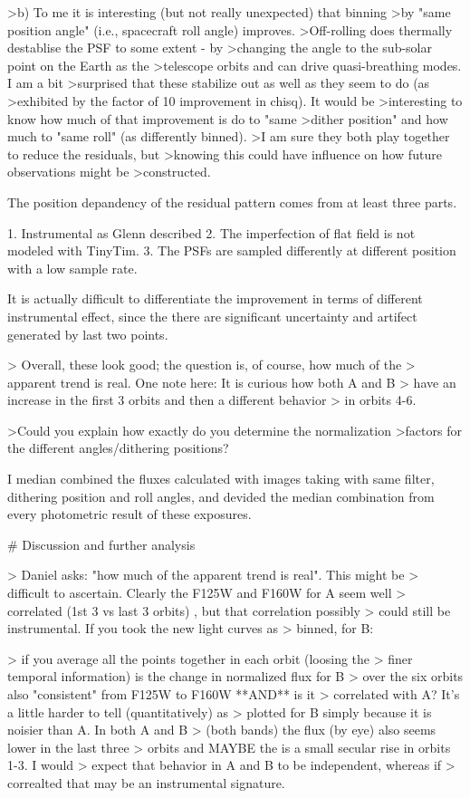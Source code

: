 \documentclass[paper=letter, fontsize=11pt]{scrartcl} %
\numberwithin{equation}{section} %
\numberwithin{figure}{section} %
\numberwithin{table}{section} %
\begin{document}
>b) To me it is interesting (but not really unexpected) that binning
>by "same position angle" (i.e., spacecraft roll angle) improves.
>Off-rolling does thermally destablise the PSF to some extent - by
>changing the angle to the sub-solar point on the Earth as the
>telescope orbits and can drive quasi-breathing modes.  I am a bit
>surprised that these stabilize out as well as they seem to do (as
>exhibited by the factor of 10 improvement in chisq).  It would be
>interesting to know how much of that improvement is do to "same
>dither position" and how much to "same roll" (as differently binned).
>I am sure they both play together to reduce the residuals, but
>knowing this could have influence on how future observations might be
>constructed.


The position depandency of the residual pattern comes from at least
three parts.

1. Instrumental as Glenn described
2. The imperfection of flat field is not modeled with TinyTim.
3. The PSFs are sampled differently at different position with a low
sample rate.

It is actually difficult to differentiate the improvement in terms of
different instrumental effect, since the there are significant
uncertainty and artifect generated by last two points.


> Overall, these look good; the question is, of course, how much of the
> apparent trend is real.  One note here: It is curious how both A and B
> have an increase in the first 3 orbits and then a different behavior
> in orbits 4-6.

>Could you explain how exactly do you determine the normalization
>factors for the different angles/dithering positions?

I median combined the fluxes calculated with images taking with same
filter, dithering position and roll angles, and devided the median
combination from every photometric result of these exposures.

# Discussion and further analysis

> Daniel asks: "how much of the apparent trend is real".  This might be
> difficult to ascertain.  Clearly the F125W and F160W for A seem well
> correlated (1st 3 vs last 3 orbits) , but that correlation possibly
> could still be instrumental.  If you took the new light curves as
> binned, for B:

> if you average all the points together in each orbit (loosing the
>  finer temporal information) is the change in normalized flux for B
>  over the six orbits also "consistent" from F125W to F160W **AND** is it
>  correlated with A?  It's a little harder to tell (quantitatively) as
>  plotted for B simply because it is noisier than A.  In both A and B
>  (both bands) the flux (by eye) also seems lower in the last three
>  orbits and MAYBE the is a small secular rise in orbits 1-3.  I would
>  expect that behavior in A and B to be independent, whereas if
>  correalted that may be an instrumental signature.
\end{document}
